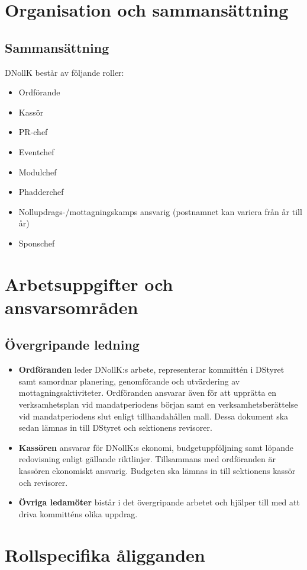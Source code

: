 \documentclass[a4paper]{dtekinstruktion}
\begin{document}
\section{Organisation och sammansättning}
\subsection{Sammansättning}
DNollK består av följande roller:
\begin{itemize}
  \item Ordförande
  \item Kassör
  \item PR-chef
  \item Eventchef
  \item Modulchef
  \item Phadderchef
  \item Nollupdrags-/mottagningskamps ansvarig (postnamnet kan variera från år till år)
  \item Sponschef
\end{itemize}

\section{Arbetsuppgifter och ansvarsområden}
\subsection{Övergripande ledning}
\begin{itemize}
  \item \textbf{Ordföranden} leder DNollK:s arbete, representerar kommittén i DStyret samt samordnar planering, genomförande och utvärdering av mottagningsaktiviteter. Ordföranden ansvarar även för att upprätta en verksamhetsplan vid mandatperiodens början samt en verksamhetsberättelse vid mandatperiodens slut enligt tillhandahållen mall. Dessa dokument ska sedan lämnas in till DStyret och sektionens revisorer.
  \item \textbf{Kassören} ansvarar för DNollK:s ekonomi, budgetuppföljning samt löpande redovisning enligt gällande riktlinjer. Tillsammans med ordföranden är kassören ekonomiskt ansvarig. Budgeten ska lämnas in till sektionens kassör och revisorer.
  \item \textbf{Övriga ledamöter} bistår i det övergripande arbetet och hjälper till med att driva kommitténs olika uppdrag.
\end{itemize}

\section{Rollspecifika åligganden}
\end{document}
